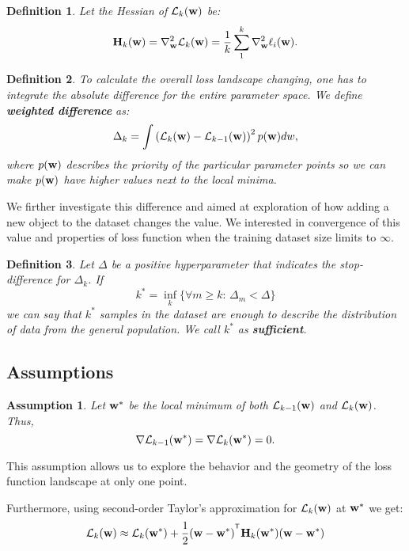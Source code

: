 \documentclass{article}
\newtheorem{definition}{Definition}
\newtheorem{assumption}{Assumption}
\begin{document}
\begin{definition}
  Let the Hessian of $\mathcal{L}_k(\mathbf{w})$ be:
  $$\mathbf{H}_k(\mathbf{w}) = \nabla^2_{\mathbf{w}}\mathcal{L}_k(\mathbf{w}) = \frac1k \sum\limits_1^k \nabla^2_{\mathbf{w}} \ell_i(\mathbf{w}).$$
\end{definition}

\begin{definition}
  To calculate the overall loss landscape changing, one has to integrate the absolute difference for the entire parameter space.
  We define \textbf{weighted difference} as:
  $$\Delta_{k} = \int \left( \mathcal{L}_{k}(\mathbf{w}) - \mathcal{L}_{k-1}(\mathbf{w}) \right)^2 p(\mathbf{w}) dw,$$
  where $p(\mathbf{w})$ describes the priority of the particular parameter points so we can make $p(\mathbf{w})$ have higher values
  next to the local minima.
\end{definition}

We firther investigate this difference and aimed at exploration of how adding a new object to the dataset changes the value.
We interested in convergence of this value and properties of loss function when the training dataset size limits to $\infty$.


\begin{definition}
  Let $\Delta$ be a positive hyperparameter that indicates the stop-difference for $\Delta_k$. If
  $$k^* = \inf\limits_k\{\forall m \geq k: \, \Delta_m < \Delta\}$$
  we can say that $k^*$ samples in the dataset are enough to describe the distribution of data from the general population.
  We call $k^*$ as \textbf{sufficient}.
\end{definition}

\subsection{Assumptions}

\begin{assumption}
  Let $\mathbf{w}^*$ be the local minimum of both $\mathcal{L}_{k-1}(\mathbf{w})$ and $\mathcal{L}_{k}(\mathbf{w})$.
  Thus, $$\nabla \mathcal{L}_{k-1}(\mathbf{w}^*) = \nabla \mathcal{L}_{k}(\mathbf{w}^*) = 0.$$
\end{assumption}

This assumption allows us to explore the behavior and the geometry of the loss function landscape at only one point.

Furthermore, using second-order Taylor's approximation for $\mathcal{L}_{k}(\mathbf{w})$ at $\mathbf{w}^*$ we get:
$$\mathcal{L}_{k}(\bw) \approx \mathcal{L}_{k}(\bw^*) + \frac12 (\bw - \bw^*)^{\T} \bH_k(\bw^*)
  (\bw - \bw^*)$$
\end{document}
